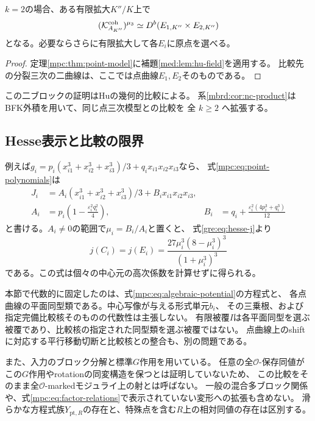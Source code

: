 \begin{corollary}[二ブロック同変残余圏の点曲線積]
\label{mpc:cor:point-product}
$k=2$の場合、ある有限拡大$K''/K$上で
\[
 (\mathcal K^{\rm coh}_{A_{K''}})^{\mu_3}
 \simeq D^b(E_{1,K''}\times E_{2,K''})
\]
となる。必要ならさらに有限拡大して各$E_i$に原点を選べる。
\end{corollary}
\begin{proof}
定理\ref{mpc:thm:point-model}に補題\ref{med:lem:hu-field}を適用する。
比較先の分裂三次の二曲線は、ここでは点曲線$E_1,E_2$そのものである。
\end{proof}

この二ブロックの証明はHuの幾何的比較による。
系\ref{mbrd:cor:nc-product}はBFK外積を用いて、同じ点三次模型との比較を
全 $k\ge2$ へ拡張する。

\subsection{Hesse表示と比較の限界}

例えば$g_i=p_i(x_{i1}^3+x_{i2}^3+x_{i3}^3)/3+q_ix_{i1}x_{i2}x_{i3}$なら、
式\eqref{mpc:eq:point-polynomials}は
\[
 \begin{aligned}
 J_i&=A_i(x_{i1}^3+x_{i2}^3+x_{i3}^3)/3+B_ix_{i1}x_{i2}x_{i3},\\
 A_i&=p_i\left(1-\frac{\varepsilon_i^2q_i^2}{4}\right),
 &B_i&=q_i+\frac{\varepsilon_i^2(4p_i^3+q_i^3)}{12}
 \end{aligned}
\]
と書ける。$A_i\ne0$の範囲で$\mu_i=B_i/A_i$と置くと、
式\eqref{gre:eq:hesse-j}より
\[
 j(C_i)=j(E_i)
 =\frac{27\mu_i^3(8-\mu_i^3)^3}{(1+\mu_i^3)^3}
\]
である。この式は個々の中心元の高次係数を計算せずに得られる。

本節で代数的に固定したのは、式\eqref{mpc:eq:algebraic-potential}の方程式と、
各点曲線の平面同型類である。中心写像が与える形式単元$b_i$、
その三乗根、および指定完備比較核そのものの代数性は主張しない。
有限被覆$I$は各平面同型を選ぶ被覆であり、比較核の指定された同型類を選ぶ被覆ではない。
点曲線上のshiftに対応する平行移動切断と比較核との整合も、別の問題である。

また、入力のブロック分解と標準$G$作用を用いている。
任意の全$\mathcal O$-保存同値がこの$G$作用やrotationの同変構造を保つとは証明していないため、
この比較をそのまま全$\mathcal O$-markedモジュライ上の射とは呼ばない。
一般の混合多ブロック関係や、式\eqref{mpc:eq:factor-relations}で表示されていない変形への拡張も含めない。
滑らかな方程式族$Y_{\mathrm{pt},R}$の存在と、特殊点を含む$R$上の相対同値の存在は区別する。
